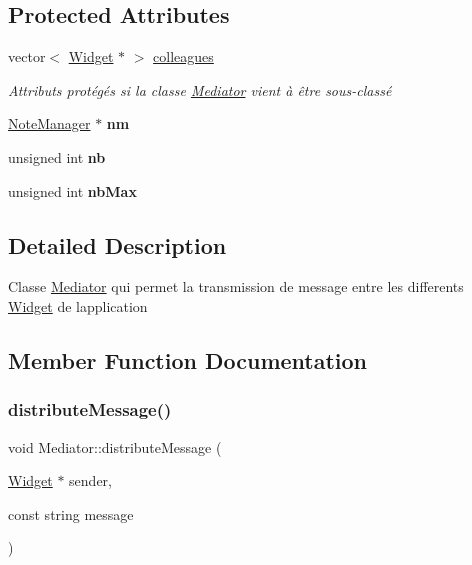 \subsection*{Protected Attributes}
\begin{DoxyCompactItemize}
\item 
\mbox{\label{classMediator_a0b7efbede213b7a9ac81e25bdda7f943}} 
vector$<$ \hyperlink{classWidget}{Widget} $\ast$ $>$ \hyperlink{classMediator_a0b7efbede213b7a9ac81e25bdda7f943}{colleagues}
\begin{DoxyCompactList}\small\item\em Attributs protégés si la classe \hyperlink{classMediator}{Mediator} vient à être sous-\/classé \end{DoxyCompactList}\item 
\mbox{\label{classMediator_aff24a86b4a88e6c4da795216c72ad89a}} 
\hyperlink{classNoteManager}{Note\+Manager} $\ast$ {\bfseries nm}
\item 
\mbox{\label{classMediator_a1165c6f9067f39254a76dbca31f7f35a}} 
unsigned int {\bfseries nb}
\item 
\mbox{\label{classMediator_a0f0f1c89941f4a9eee97d39a374683cc}} 
unsigned int {\bfseries nb\+Max}
\end{DoxyCompactItemize}


\subsection{Detailed Description}
Classe \hyperlink{classMediator}{Mediator} qui permet la transmission de message entre les differents \hyperlink{classWidget}{Widget} de l\textquotesingle{}application 

\subsection{Member Function Documentation}
\mbox{\label{classMediator_a6d85bc8652e2fbd4f37b7ba67559c9e3}} 
\subsubsection{\texorpdfstring{distribute\+Message()}{distributeMessage()}}
{\footnotesize\ttfamily void Mediator\+::distribute\+Message (\begin{DoxyParamCaption}\item[{\hyperlink{classWidget}{Widget} $\ast$}]{sender,  }\item[{const string}]{message }\end{DoxyParamCaption})\hspace{0.3cm}{\ttfamily [virtual]}}



